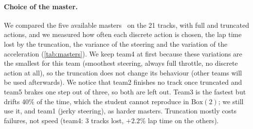 \documentclass[10pt,a4paper]{article}
\begin{document}
\paragraph{Choice of the master.}
We compared the five available masters~\cite{pystkproject} on the 21 tracks, with full and truncated actions, and we measured how often each discrete action is chosen, the lap time lost by the truncation, the variance of the steering and the variation of the acceleration (\cref{tab:masters}).
We keep team4 at first because these variations are the smallest for this team (smoothest steering, always full throttle, no discrete action at all), so the truncation does not change its behaviour (other teams will be used afterwards). 
We notice that team2 finishes no track once truncated and team5 brakes one step out of three, so both are left out.
Team3 is the fastest but drifts 40\% of the time, which the student cannot reproduce in $\mathrm{Box}(2)$; we still use it, and team1 (jerky steering), as harder masters.
Truncation mostly costs failures, not speed (team4: 3 tracks lost, $+2.2\%$ lap time on the others).

\begin{table}[t]
\centering\small
\setlength{\tabcolsep}{2.5pt}
\caption{\textbf{Masters with truncated actions.} Lap time in steps (truncated / full actions, 1 episode), tracks finished out of 21 with truncated actions, and behaviour on lighthouse with full actions: share of steps with brake, drift and nitro, mean $|\Delta\text{steer}|$ between steps and share of steps with acceleration $<1$. team4 is the smoothest and the only one without any discrete action.}
\label{tab:masters}
\end{table}
\end{document}
